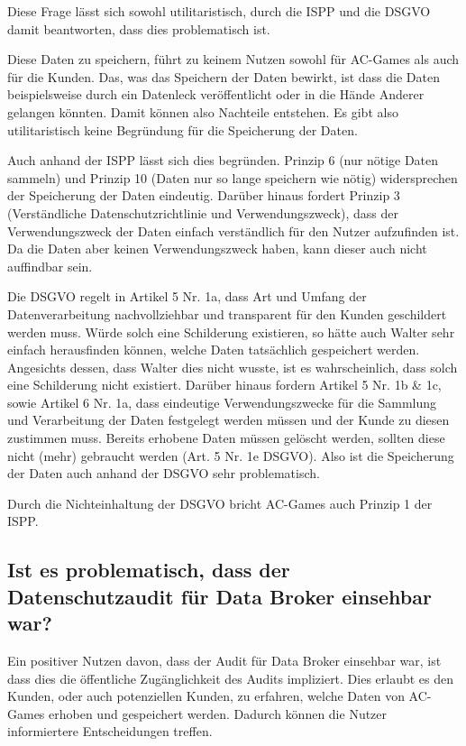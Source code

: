 Diese Frage lässt sich sowohl utilitaristisch, durch die ISPP und die DSGVO damit beantworten, dass dies problematisch ist.

Diese Daten zu speichern, führt zu keinem Nutzen sowohl für AC-Games als auch für die Kunden.
Das, was das Speichern der Daten bewirkt, ist dass die Daten beispielsweise durch ein Datenleck veröffentlicht oder in die Hände Anderer gelangen könnten.
Damit können also Nachteile entstehen.
Es gibt also utilitaristisch keine Begründung für die Speicherung der Daten.

Auch anhand der ISPP lässt sich dies begründen. Prinzip 6 (nur nötige Daten sammeln) und Prinzip 10 (Daten nur so lange speichern wie nötig) widersprechen der Speicherung der Daten eindeutig.
Darüber hinaus fordert Prinzip 3 (Verständliche Datenschutzrichtlinie und Verwendungszweck), dass der Verwendungszweck der Daten einfach verständlich für den Nutzer aufzufinden ist.
Da die Daten aber keinen Verwendungszweck haben, kann dieser auch nicht auffindbar sein.  

Die DSGVO regelt in Artikel 5 Nr. 1a, dass Art und Umfang der Datenverarbeitung nachvollziehbar und transparent für den Kunden geschildert werden muss.
Würde solch eine Schilderung existieren, so hätte auch Walter sehr einfach herausfinden können, welche Daten tatsächlich gespeichert werden.
Angesichts dessen, dass Walter dies nicht wusste, ist es wahrscheinlich, dass solch eine Schilderung nicht existiert.
Darüber hinaus fordern Artikel 5 Nr. 1b \& 1c, sowie Artikel 6 Nr. 1a, dass eindeutige Verwendungszwecke für die Sammlung und Verarbeitung der Daten festgelegt werden müssen und der Kunde zu diesen zustimmen muss.
Bereits erhobene Daten müssen gelöscht werden, sollten diese nicht (mehr) gebraucht werden (Art. 5 Nr. 1e DSGVO).
Also ist die Speicherung der Daten auch anhand der DSGVO sehr problematisch.

Durch die Nichteinhaltung der DSGVO bricht AC-Games auch Prinzip 1 der ISPP.

\subsection*{Ist es problematisch, dass der Datenschutzaudit für Data Broker einsehbar war? \cite{kees_faites_2017}}

Ein positiver Nutzen davon, dass der Audit für Data Broker einsehbar war, ist dass dies die öffentliche Zugänglichkeit des Audits impliziert.
Dies erlaubt es den Kunden, oder auch potenziellen Kunden, zu erfahren, welche Daten von AC-Games erhoben und gespeichert werden. Dadurch können die Nutzer informiertere Entscheidungen treffen.

